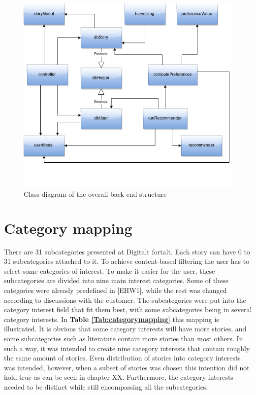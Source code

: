 \begin{figure}[h!]
	\centering
	\includegraphics[width=\textwidth]{fig/overall_backend}
	\caption{Class diagram of the overall back end structure}
	\label{Fig:overall_backend}
\end{figure}

\section{Category mapping} 
\label{sec:categorymapping}

There are 31 subcategories presented at Digitalt fortalt. Each story can have 0 to 31 subcategories attached to it. To achieve content-based filtering the user has to select some categories of interest. To make it easier for the user, these subcategories are divided into nine main interest categories. Some of these categories were already predefined in [EHW1], while the rest was changed according to discussions with the customer. The subcategories were put into the category interest field that fit them best, with some subcategories being in several category interests. In \textbf{Table \ref{Tab:categorymapping}} this mapping is illustrated. It is obvious that some category interests will have more stories, and some subcategories such as literature contain more stories than most others. In such a way, it was intended to create nine category interests that contain roughly the same amount of stories. Even distribution of stories into category interests was intended, however, when a subset of stories was chosen this intention did not hold true as can be seen in chapter XX. Furthermore, the category interests needed to be distinct while still encompassing all the subcategories. 

